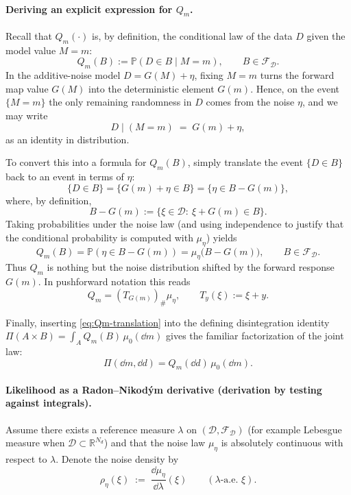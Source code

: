 \documentclass[11pt]{article}
\theoremstyle{remark}
\newcommand{\dataspace}{\mathcal{D}}
\begin{document}
\paragraph{Deriving an explicit expression for \(Q_m\).}
Recall that \(Q_m(\cdot)\) is, by definition, the conditional law of the data \(D\)
given the model value \(M=m\):
\[
Q_m(B) := \mathbb{P}(D\in B \mid M=m),\qquad B\in\mathcal{F}_{\dataspace}.
\]
In the additive-noise model \(D = G(M)+\eta\), fixing \(M=m\) turns the forward map
value \(G(M)\) into the deterministic element \(G(m)\).  Hence, on the event \(\{M=m\}\)
the only remaining randomness in \(D\) comes from the noise \(\eta\), and we may write
\[
D \;\big|\; (M=m)
\;=\;
G(m)+\eta,
\]
as an identity in distribution.

To convert this into a formula for \(Q_m(B)\), simply translate the event \(\{D\in B\}\)
back to an event in terms of \(\eta\):
\[
\{D\in B\}
=
\{G(m)+\eta \in B\}
=
\{\eta \in B - G(m)\},
\]
where, by definition,
\[
B-G(m):=\{\xi\in\dataspace:\ \xi+G(m)\in B\}.
\]
Taking probabilities under the noise law (and using independence to justify that the
conditional probability is computed with \(\mu_\eta\)) yields
\begin{equation}\label{eq:Qm-translation}
Q_m(B)
=
\mathbb{P}(\eta\in B-G(m))
=
\mu_\eta\!\bigl(B-G(m)\bigr),
\qquad B\in\mathcal{F}_{\dataspace}.
\end{equation}
Thus \(Q_m\) is nothing but the noise distribution shifted by the forward response
\(G(m)\).  In pushforward notation this reads
\[
Q_m = (T_{G(m)})_\#\mu_\eta,
\qquad
T_{y}(\xi):=\xi+y.
\]

Finally, inserting \eqref{eq:Qm-translation} into the defining disintegration identity
\(\Pi(A\times B)=\int_A Q_m(B)\,\mu_0(\dd m)\) gives the familiar factorization of the
joint law:
\begin{equation}\label{eq:Pi-disintegration-noise}
\Pi(\dd m,\dd d)=Q_m(\dd d)\,\mu_0(\dd m).
\end{equation}

\paragraph{Likelihood as a Radon--Nikod\'ym derivative (derivation by testing against integrals).}
Assume there exists a reference measure \(\lambda\) on
\((\dataspace,\mathcal{F}_{\dataspace})\) (for example Lebesgue measure when
\(\dataspace\subset\mathbb{R}^{N_d}\)) and that the noise law \(\mu_\eta\)
is absolutely continuous with respect to \(\lambda\). Denote the noise density
by
\[
\rho_\eta(\xi)\;:=\;\frac{\dd\mu_\eta}{\dd\lambda}(\xi)\qquad
(\lambda\text{-a.e. } \xi).
\]
\end{document}
